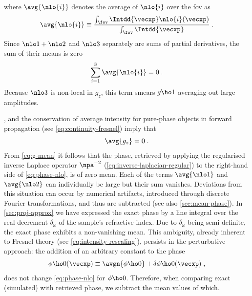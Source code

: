 \documentclass[
twoside,
openright,
titlepage,
numbers=noenddot,
headinclude,
fleqn,
a4paper,
footinclude=true,
cleardoublepage=empty,
abstractoff,
BCOR=5mm,
paper=a4,
fontsize=11pt,
british,ngerman,american,
]{scrreprt}
\begin{document}
where $\avg{\nlo{i}}$ denotes the average of $\nlo{i}$ over the
\acf{fov} as
\begin{equation}
  \label{eq:mean-value}
  \avg{\nlo{i}} \equiv 
  \frac{  \int_{\fov}\Intdd{\vecxp}\nlo{i}(\vecxp)}
  {\int_{\fov}\Intdd{\vecxp}} \;.
\end{equation}
Since $\nlo1+\nlo2$ and $\nlo3$ separately are sums of partial
derivatives, the sum of their means is zero
\begin{equation}
  \label{eq:nlo-mean-sum}
  \sum_{i=1}^3 \avg{\nlo{i}} = 0 \;.
\end{equation}
Because $\nlo3$ is non-local in $g_z$, this term smears $g\ho1$
averaging out large amplitudes.
 
, and the
conservation of average intensity for pure-phase objects in
forward propagation (see \cref{eq:continuity-fresnel}) imply that
\begin{equation}
  \label{eq:g-mean}
  \avg{ g_z}=0 \;.
\end{equation}
From \cref{eq:g-mean} it follows that the phase, retrieved by applying
the regularised inverse Laplace operator $\npa^{-2}$
(\cref{eq:inverse-laplacian-regular}) to the right-hand side of
\cref{eq:phase-nlo}, is of zero mean.  Each of the terms $\avg{\nlo1}$
and $\avg{\nlo2}$ can individually be large but their sum vanishes.
Deviations from this situation can occur by numerical artifacts,
introduced through discrete Fourier transformations, and thus are
subtracted (see also \cref{sec:mean-phase}).  In
\cref{sec:proj-approx} we have expressed the exact phase by a line
integral over the real decrement $\delta_\omega$ of the sample's
refractive index.  Due to $\delta_\omega$ being semi definite, the
exact phase exhibits a non-vanishing mean.  This ambiguity, already
inherent to Fresnel theory (see \cref{eq:intensity-rescaling}),
persists in the perturbative approach: the addition of an arbitrary
constant to the phase
\begin{equation}
  \label{eq:phi-decomposition}
  \phi\ho0(\vecxp) \equiv \avgn{\phi\ho0} + \delta\phi\ho0(\vecxp) \;,
\end{equation}
does not change \cref{eq:phase-nlo} for $\phi\ho0$.  Therefore, when
comparing exact (simulated) with retrieved phase, we subtract the mean
values of which.
\end{document}
